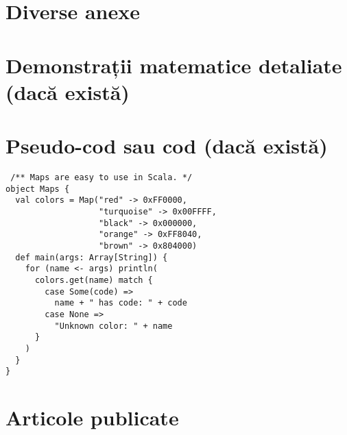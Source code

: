\appendix

\chapter{Diverse anexe}


\chapter{Demonstrații matematice detaliate (dacă există)}


\chapter{Pseudo-cod sau cod (dacă există)}



\begin{lstlisting}
 /** Maps are easy to use in Scala. */
object Maps {
  val colors = Map("red" -> 0xFF0000,
                   "turquoise" -> 0x00FFFF,
                   "black" -> 0x000000,
                   "orange" -> 0xFF8040,
                   "brown" -> 0x804000)
  def main(args: Array[String]) {
    for (name <- args) println(
      colors.get(name) match {
        case Some(code) =>
          name + " has code: " + code
        case None =>
          "Unknown color: " + name
      }
    )
  }
}
\end{lstlisting}


\chapter{Articole publicate}

